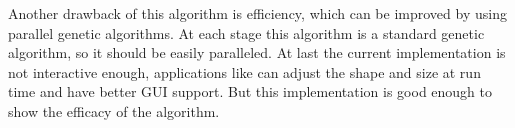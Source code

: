 \documentclass[a4paper,conference]{IEEEtran}
\begin{document}
Another drawback of this algorithm is efficiency, which can be improved by using parallel genetic algorithms\cite{10.1145/3400031}. At each stage this algorithm is a standard genetic algorithm, so it should be easily paralleled. At last the current implementation is not interactive enough, applications like \cite{primitive}\cite{geometrize} can adjust the shape and size at run time and have better GUI support. But this implementation is good enough to show the efficacy of the algorithm. 



\end{document}
